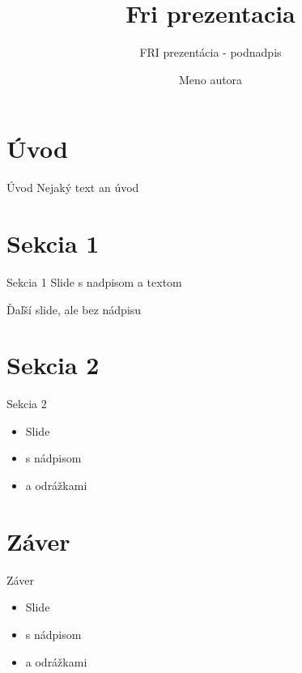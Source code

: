 \documentclass{beamer}
\author{Meno autora}
\title{Fri prezentacia}
\subtitle{FRI prezentácia - podnadpis}
\begin{document}
\frontcover

\frame{\titlepage}

\frame{\tableofcontents}

\section{Úvod}

\begin{frame}{Úvod}
Nejaký text an úvod
\end{frame}

\section{Sekcia 1}
\frame{\sectionpage}

\begin{frame}{Sekcia 1}
Slide s nadpisom a textom
\end{frame}

\begin{frame}
Ďaľší slide, ale bez nádpisu
\end{frame}

\section{Sekcia 2}
\frame{\sectionpage}

\begin{frame}{Sekcia 2}
	\begin{itemize}
		\item Slide 
		\item s nádpisom
		\item a odrážkami
	\end{itemize}
\end{frame}

\section{Záver}

\begin{frame}{Záver}
	\begin{itemize}
		\item Slide 
		\item s nádpisom
		\item a odrážkami
	\end{itemize}
\end{frame}

\backcover
\end{document}
